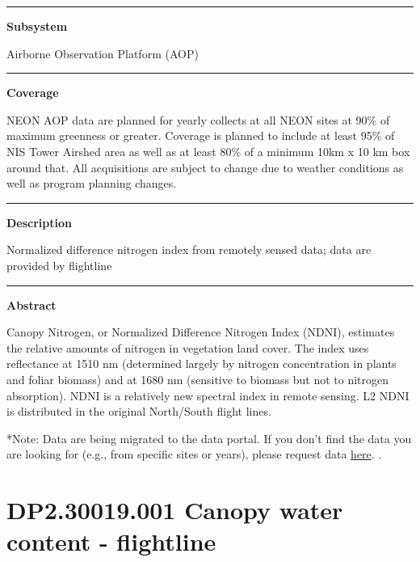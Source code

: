 \documentclass[]{article}
\begin{document}
\begin{center}\rule{0.5\linewidth}{\linethickness}\end{center}

\textbf{Subsystem}

Airborne Observation Platform (AOP)

\begin{center}\rule{0.5\linewidth}{\linethickness}\end{center}

\textbf{Coverage}

NEON AOP data are planned for yearly collects at all NEON sites at 90\%
of maximum greenness or greater. Coverage is planned to include at least
95\% of NIS Tower Airshed area as well as at least 80\% of a minimum
10km x 10 km box around that. All acquisitions are subject to change due
to weather conditions as well as program planning changes.

\begin{center}\rule{0.5\linewidth}{\linethickness}\end{center}

\textbf{Description}

Normalized difference nitrogen index from remotely sensed data; data are
provided by flightline

\begin{center}\rule{0.5\linewidth}{\linethickness}\end{center}

\textbf{Abstract}

Canopy Nitrogen, or Normalized Difference Nitrogen Index (NDNI),
estimates the relative amounts of nitrogen in vegetation land cover. The
index uses reflectance at 1510 nm (determined largely by nitrogen
concentration in plants and foliar biomass) and at 1680 nm (sensitive to
biomass but not to nitrogen absorption). NDNI is a relatively new
spectral index in remote sensing. L2 NDNI is distributed in the original
North/South flight lines.

*Note: Data are being migrated to the data portal. If you don't find the
data you are looking for (e.g., from specific sites or years), please
request data
\href{http://www.neonscience.org/request-airborne-data}{here}. \newpage
.

\section{DP2.30019.001 Canopy water content -
flightline}\label{dp2.30019.001-canopy-water-content---flightline}
\end{document}
